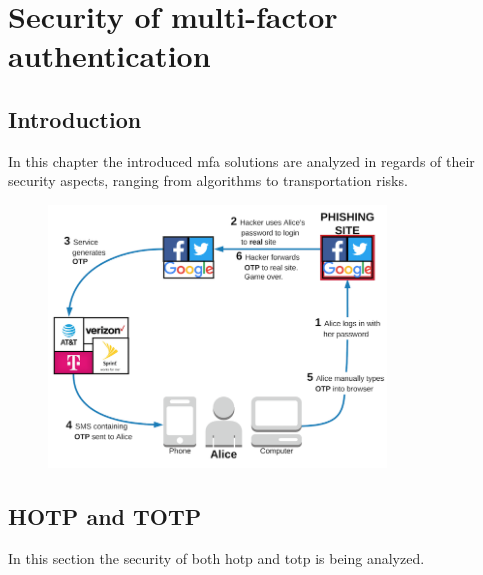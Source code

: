 \chapter{Security of multi-factor authentication}

\section{Introduction}

In this chapter the introduced \gls{mfa} solutions are analyzed in regards of their security aspects, ranging from algorithms to transportation risks.

\begin{figure}[hbt]
 	\centering
	\includegraphics[width=0.8\textwidth]{pics/06---phishing-attack-2.png}
	\caption{}
\end{figure}

\section{HOTP and TOTP}

In this section the security of both \gls{hotp} and \gls{totp} is being analyzed.

